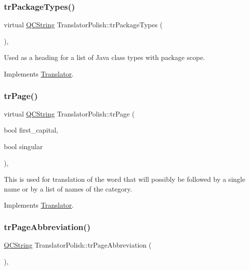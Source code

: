 \subsubsection{\texorpdfstring{trPackageTypes()}{trPackageTypes()}}
{\footnotesize\ttfamily virtual \mbox{\hyperlink{class_q_c_string}{Q\+C\+String}} Translator\+Polish\+::tr\+Package\+Types (\begin{DoxyParamCaption}{ }\end{DoxyParamCaption})\hspace{0.3cm}{\ttfamily [inline]}, {\ttfamily [virtual]}}

Used as a heading for a list of Java class types with package scope. 

Implements \mbox{\hyperlink{class_translator}{Translator}}.

\mbox{\label{class_translator_polish_a7a2c4092e039a8154d249301433e65b0}} 
\subsubsection{\texorpdfstring{trPage()}{trPage()}}
{\footnotesize\ttfamily virtual \mbox{\hyperlink{class_q_c_string}{Q\+C\+String}} Translator\+Polish\+::tr\+Page (\begin{DoxyParamCaption}\item[{bool}]{first\+\_\+capital,  }\item[{bool}]{singular }\end{DoxyParamCaption})\hspace{0.3cm}{\ttfamily [inline]}, {\ttfamily [virtual]}}

This is used for translation of the word that will possibly be followed by a single name or by a list of names of the category. 

Implements \mbox{\hyperlink{class_translator}{Translator}}.

\mbox{\label{class_translator_polish_a1ab1467678c57a72f34102a46c9f1b98}} 
\subsubsection{\texorpdfstring{trPageAbbreviation()}{trPageAbbreviation()}}
{\footnotesize\ttfamily \mbox{\hyperlink{class_q_c_string}{Q\+C\+String}} Translator\+Polish\+::tr\+Page\+Abbreviation (\begin{DoxyParamCaption}{ }\end{DoxyParamCaption})\hspace{0.3cm}{\ttfamily [inline]}, {\ttfamily [virtual]}}

